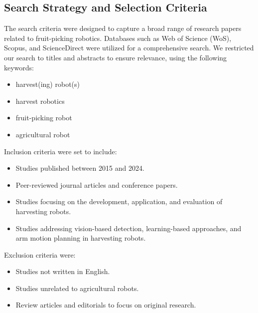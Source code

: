 \documentclass[a4paper,fleqn]{cas-dc}
\begin{document}
\iffalse
\subsection{Search Strategy and Selection Criteria}
The search criteria were designed to capture a broad range of research papers related to fruit-picking robotics. Databases such as Web of Science (WoS), Scopus, and ScienceDirect were utilized for a comprehensive search. 
We restricted our search to titles and abstracts to ensure relevance, using the following keywords:
\begin{itemize}
    \item harvest(ing) robot(s)
    \item harvest robotics
    \item fruit-picking robot
    \item agricultural robot
\end{itemize}

Inclusion criteria were set to include:
\begin{itemize}
    \item Studies published between 2015 and 2024.
    \item Peer-reviewed journal articles and conference papers.
    \item Studies focusing on the development, application, and evaluation of harvesting robots.
    \item Studies addressing vision-based detection, learning-based approaches, and arm motion planning in harvesting robots.
\end{itemize}

Exclusion criteria were:
\begin{itemize}
    \item Studies not written in English.
    \item Studies unrelated to agricultural robots.
    \item Review articles and editorials to focus on original research.
\end{itemize}
\end{document}
